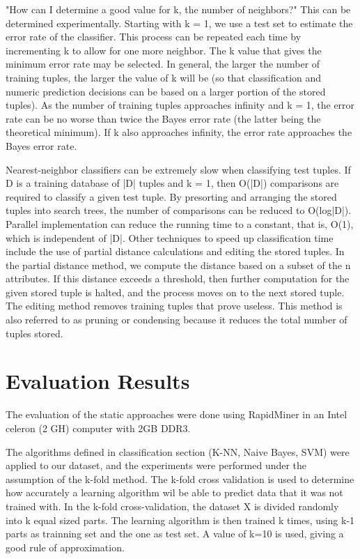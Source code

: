 "How can I determine a good value for k, the number of neighbors?" This can be determined experimentally. Starting with k = 1, we use a test set to estimate the error rate
of the classifier. This process can be repeated each time by incrementing k to allow for one more neighbor. The k value that gives the minimum error rate may be selected. In
general, the larger the number of training tuples, the larger the value of k will be (so that classification and numeric prediction decisions can be based on a larger portion of the stored tuples). As the number of training tuples approaches infinity and k = 1, the error rate can be no worse than twice the Bayes error rate (the latter being the theoretical minimum). If k also approaches infinity, the error rate approaches the Bayes error rate.\bigskip

Nearest-neighbor classifiers can be extremely slow when classifying test tuples. If D is a training database of |D| tuples and k = 1, then O(|D|) comparisons are required to
classify a given test tuple. By presorting and arranging the stored tuples into search trees, the number of comparisons can be reduced to O(log|D|). Parallel implementation can
reduce the running time to a constant, that is, O(1), which is independent of |D|. Other techniques to speed up classification time include the use of partial distance
calculations and editing the stored tuples. In the partial distance method, we compute the distance based on a subset of the n attributes. If this distance exceeds a threshold,
then further computation for the given stored tuple is halted, and the process moves on to the next stored tuple. The editing method removes training tuples that prove useless. This method is also referred to as pruning or condensing because it reduces the total
number of tuples stored.
\bigskip

\section{Evaluation Results}
The evaluation of the static approaches were done using RapidMiner in an Intel celeron (2 GH) computer with 2GB DDR3.\bigskip

The algorithms defined in classification section (K-NN, Naive Bayes, SVM) were applied to our dataset, and the experiments were performed under the assumption of the k-fold method. The k-fold cross validation is used to determine how accurately a learning algorithm wil be able to predict data that it was not trained with. In the k-fold cross-validation, the dataset X is divided randomly into k equal sized parts. The learning algorithm is then trained k times, using k-1 parts as trainning set and the one as test set. A value of k=10 is used, giving a good rule of approximation.
\bigskip


